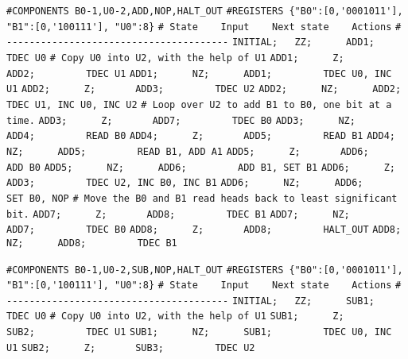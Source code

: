 \begin{apgsembly}
	\centering
	\begin{minipage}[t]{.49\textwidth}
		\begin{algorithmic}\tiny
			\State \verb|#COMPONENTS B0-1,U0-2,ADD,NOP,HALT_OUT|
			\State \verb|#REGISTERS {"B0":[0,'0001011'], "B1":[0,'100111'], "U0":8}|
			\State \verb|# State    Input    Next state    Actions|
			\State \verb|# ---------------------------------------|
			\State \verb|INITIAL;   ZZ;      ADD1;         TDEC U0|
			\State \verb||
			\State \verb|# Copy U0 into U2, with the help of U1|
			\State \verb|ADD1;      Z;       ADD2;         TDEC U1|
			\State \verb|ADD1;      NZ;      ADD1;         TDEC U0, INC U1|
			\State \verb|ADD2;      Z;       ADD3;         TDEC U2|
			\State \verb|ADD2;      NZ;      ADD2;         TDEC U1, INC U0, INC U2|
			\State \verb||
			\State \verb|# Loop over U2 to add B1 to B0, one bit at a time.|
			\State \verb|ADD3;      Z;       ADD7;         TDEC B0|
			\State \verb|ADD3;      NZ;      ADD4;         READ B0|
			\State \verb|ADD4;      Z;       ADD5;         READ B1|
			\State \verb|ADD4;      NZ;      ADD5;         READ B1, ADD A1|
			\State \verb|ADD5;      Z;       ADD6;         ADD B0|
			\State \verb|ADD5;      NZ;      ADD6;         ADD B1, SET B1|
			\State \verb|ADD6;      Z;       ADD3;         TDEC U2, INC B0, INC B1|
			\State \verb|ADD6;      NZ;      ADD6;         SET B0, NOP|
			\State \verb||
			\State \verb|# Move the B0 and B1 read heads back to least significant bit.|
			\State \verb|ADD7;      Z;       ADD8;         TDEC B1|
			\State \verb|ADD7;      NZ;      ADD7;         TDEC B0|
			\State \verb|ADD8;      Z;       ADD8;         HALT_OUT|
			\State \verb|ADD8;      NZ;      ADD8;         TDEC B1|
		\end{algorithmic}
	\end{minipage}\hfill{\color{gray}\vline}\hfill
	\begin{minipage}[t]{.49\textwidth}
		\begin{algorithmic}\tiny
			\State \verb|#COMPONENTS B0-1,U0-2,SUB,NOP,HALT_OUT|
			\State \verb|#REGISTERS {"B0":[0,'0001011'], "B1":[0,'100111'], "U0":8}|
			\State \verb|# State    Input    Next state    Actions|
			\State \verb|# ---------------------------------------|
			\State \verb|INITIAL;   ZZ;      SUB1;         TDEC U0|
			\State \verb||
			\State \verb|# Copy U0 into U2, with the help of U1|
			\State \verb|SUB1;      Z;       SUB2;         TDEC U1|
			\State \verb|SUB1;      NZ;      SUB1;         TDEC U0, INC U1|
			\State \verb|SUB2;      Z;       SUB3;         TDEC U2|

\end{algorithmic}
\end{minipage}
\end{apgsembly}
